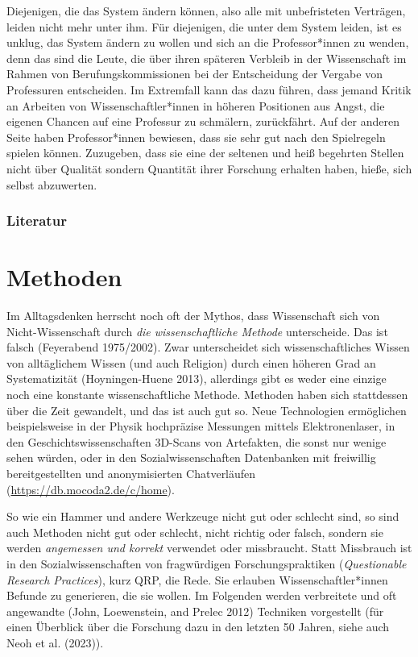 \documentclass[
  letterpaper,
  DIV=11,
  numbers=noendperiod]{scrreprt}
\begin{document}
Diejenigen, die das System ändern können, also alle mit unbefristeten
Verträgen, leiden nicht mehr unter ihm. Für diejenigen, die unter dem
System leiden, ist es unklug, das System ändern zu wollen und sich an
die Professor*innen zu wenden, denn das sind die Leute, die über ihren
späteren Verbleib in der Wissenschaft im Rahmen von
Berufungskommissionen bei der Entscheidung der Vergabe von Professuren
entscheiden. Im Extremfall kann das dazu führen, dass jemand Kritik an
Arbeiten von Wissenschaftler*innen in höheren Positionen aus Angst, die
eigenen Chancen auf eine Professur zu schmälern, zurückfährt. Auf der
anderen Seite haben Professor*innen bewiesen, dass sie sehr gut nach den
Spielregeln spielen können. Zuzugeben, dass sie eine der seltenen und
heiß begehrten Stellen nicht über Qualität sondern Quantität ihrer
Forschung erhalten haben, hieße, sich selbst abzuwerten.

\subsection{Literatur}\label{literatur-9}

\chapter{Methoden}\label{methoden}

Im Alltagsdenken herrscht noch oft der Mythos, dass Wissenschaft sich
von Nicht-Wissenschaft durch \emph{die wissenschaftliche Methode}
unterscheide. Das ist falsch (Feyerabend 1975/2002). Zwar unterscheidet
sich wissenschaftliches Wissen von alltäglichem Wissen (und auch
Religion) durch einen höheren Grad an Systematizität (Hoyningen-Huene
2013), allerdings gibt es weder eine einzige noch eine konstante
wissenschaftliche Methode. Methoden haben sich stattdessen über die Zeit
gewandelt, und das ist auch gut so. Neue Technologien ermöglichen
beispielsweise in der Physik hochpräzise Messungen mittels
Elektronenlaser, in den Geschichtswissenschaften 3D-Scans von
Artefakten, die sonst nur wenige sehen würden, oder in den
Sozialwissenschaften Datenbanken mit freiwillig bereitgestellten und
anonymisierten Chatverläufen (\url{https://db.mocoda2.de/c/home}).

So wie ein Hammer und andere Werkzeuge nicht gut oder schlecht sind, so
sind auch Methoden nicht gut oder schlecht, nicht richtig oder falsch,
sondern sie werden \emph{angemessen und korrekt} verwendet oder
missbraucht. Statt Missbrauch ist in den Sozialwissenschaften von
fragwürdigen Forschungspraktiken (\emph{Questionable Research
Practices}), kurz QRP, die Rede. Sie erlauben Wissenschaftler*innen
Befunde zu generieren, die sie wollen. Im Folgenden werden verbreitete
und oft angewandte (John, Loewenstein, and Prelec 2012) Techniken
vorgestellt (für einen Überblick über die Forschung dazu in den letzten
50 Jahren, siehe auch Neoh et al. (2023)).
\end{document}
